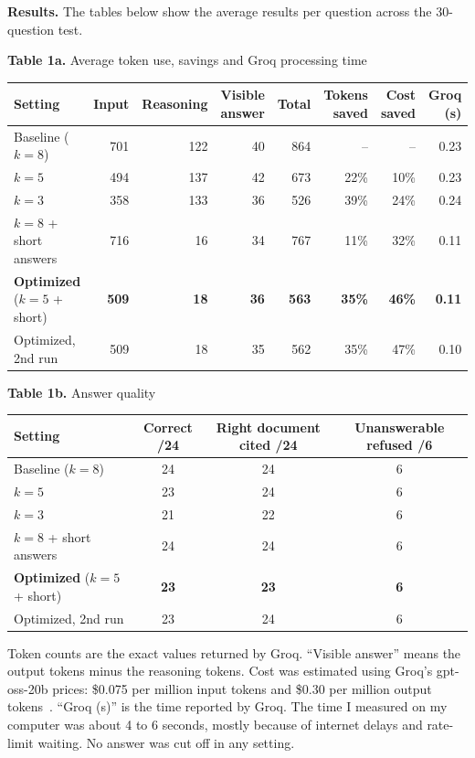 \documentclass[10pt,a4paper]{article}
\begin{document}
\textbf{Results.}
The tables below show the average results per question across the 30-question test.

\begin{table}[H]
\centering\footnotesize
\textbf{Table 1a.} Average token use, savings and Groq processing time\\[0.3em]
\begin{tabular}{l rrrr rr r}
\toprule
\textbf{Setting} & Input & Reasoning & Visible answer & Total & Tokens saved & Cost saved & Groq (s)\\
\midrule
Baseline ($k{=}8$)     & 701 & 122 & 40 & 864 & --   & --   & 0.23\\
$k{=}5$                & 494 & 137 & 42 & 673 & 22\% & 10\% & 0.23\\
$k{=}3$                & 358 & 133 & 36 & 526 & 39\% & 24\% & 0.24\\
$k{=}8$ + short answers & 716 & 16 & 34 & 767 & 11\% & 32\% & 0.11\\
\textbf{Optimized} ($k{=}5$ + short) & \textbf{509} & \textbf{18} & \textbf{36} & \textbf{563} & \textbf{35\%} & \textbf{46\%} & \textbf{0.11}\\
Optimized, 2nd run     & 509 & 18  & 35 & 562 & 35\% & 47\% & 0.10\\
\bottomrule
\end{tabular}

\vspace{0.7em}
\textbf{Table 1b.} Answer quality\\[0.3em]
\begin{tabular}{l ccc}
\toprule
\textbf{Setting} & Correct /24 & Right document cited /24 & Unanswerable refused /6\\
\midrule
Baseline ($k{=}8$)     & 24 & 24 & 6\\
$k{=}5$                & 23 & 24 & 6\\
$k{=}3$                & 21 & 22 & 6\\
$k{=}8$ + short answers & 24 & 24 & 6\\
\textbf{Optimized} ($k{=}5$ + short) & \textbf{23} & \textbf{23} & \textbf{6}\\
Optimized, 2nd run     & 23 & 24 & 6\\
\bottomrule
\end{tabular}
\end{table}

{\small Token counts are the exact values returned by Groq. ``Visible answer'' means the output tokens minus the reasoning tokens. Cost was estimated using Groq's gpt-oss-20b prices: \$0.075 per million input tokens and \$0.30 per million output tokens~\cite{groqprice}. ``Groq (s)'' is the time reported by Groq. The time I measured on my computer was about 4 to 6 seconds, mostly because of internet delays and rate-limit waiting. No answer was cut off in any setting.\par}
\end{document}

